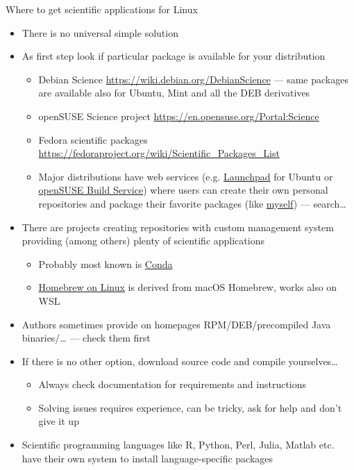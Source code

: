 \documentclass[compress, ucs, xelatex, 11pt, xcolor=svgnames, aspectratio=169,
	hyperref={
		bookmarks=true,
		unicode=true,
		colorlinks=true,
		pdftitle={Linux, command line and MetaCentrum},
		plainpages=false,
		pdfauthor={Vojtech Zeisek},
		pdfsubject={Course about use of Linux command line, writing shell scripts and using MetaCentrum of CESNET},
		pdfcreator={XeLaTeX},
		pdfkeywords={Linux, GNU, BASH, shell, command line, MetaCentrum},
		linkcolor=DarkRed, %
		anchorcolor=DarkBlue, %
		citecolor=Indigo, %
		filecolor=NavyBlue, %
		menucolor=DarkMagenta, %
		urlcolor=DarkBlue, %
		pdftex},
	url={hyphens, lowtilde} %
	]{beamer}
\begin{document}
\begin{frame}[allowframebreaks]{Where to get scientific applications for Linux}
	\begin{itemize}
		\item There is no universal simple solution
		\item As first step look if particular package is available for your distribution
		\begin{itemize}
			\item Debian Science \url{https://wiki.debian.org/DebianScience} --- same packages are available also for Ubuntu, Mint and all the DEB derivatives
			\item openSUSE Science project \url{https://en.opensuse.org/Portal:Science}
			\item Fedora scientific packages \url{https://fedoraproject.org/wiki/Scientific_Packages_List}
			\item Major distributions have web services (e.g. \href{https://launchpad.net/}{Launchpad} for Ubuntu or \href{https://build.opensuse.org/}{openSUSE Build Service}) where users can create their own personal repositories and package their favorite packages (like \href{https://build.opensuse.org/project/show/home:vojtaeus}{myself}) --- search\ldots
		\end{itemize}
		\item There are projects creating repositories with custom management system providing (among others) plenty of scientific applications
		\begin{itemize}
			\item Probably most known is \href{https://conda.io/}{Conda}
			\item \href{https://docs.brew.sh/Homebrew-on-Linux}{Homebrew on Linux} is derived from macOS Homebrew, works also on WSL
		\end{itemize}
		\item Authors sometimes provide on homepages RPM/DEB/precompiled Java binaries/\ldots{ }--- check them first
		\item If there is no other option, download source code and compile yourselves\ldots
		\begin{itemize}
			\item Always check documentation for requirements and instructions
			\item Solving issues requires experience, can be tricky, ask for help and don't give it up
		\end{itemize}
		\item Scientific programming languages like R, Python, Perl, Julia, Matlab etc. have their own system to install language-specific packages

\end{itemize}
\end{frame}
\end{document}
